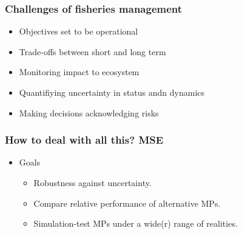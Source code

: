 \documentclass{beamer}\usepackage[]{graphicx}\usepackage[]{xcolor}
\begin{document}
\begin{frame}
\frametitle{Challenges of fisheries management}

\begin{itemize}
  \item Objectives set to be operational
  \item Trade-offs between short and long term
  \item Monitoring impact to ecosystem
  \item Quantifiying uncertainty in status andn dynamics
  \item Making decisions acknowledging risks
\end{itemize}

\end{frame}

\begin{frame}
\frametitle{How to deal with all this? MSE}


\begin{itemize}
  \item Goals
  \begin{itemize}
    \item Robustness against uncertainty.
    \item Compare relative performance of alternative MPs.
    \item Simulation-test MPs under a wide(r) range of realities.
  \end{itemize}
\end{itemize}

\end{frame}
\end{document}
